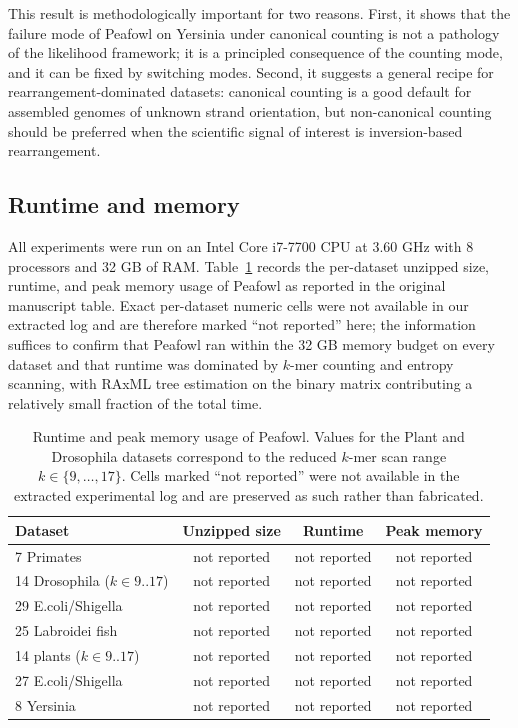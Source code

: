 \documentclass[11pt]{article}
\begin{document}
This result is methodologically important for two reasons. First, it shows
that the failure mode of Peafowl on Yersinia under canonical counting is
not a pathology of the likelihood framework; it is a principled consequence
of the counting mode, and it can be fixed by switching modes. Second, it
suggests a general recipe for rearrangement-dominated datasets: canonical
counting is a good default for assembled genomes of unknown strand
orientation, but non-canonical counting should be preferred when the
scientific signal of interest is inversion-based rearrangement.

\subsection{Runtime and memory}

All experiments were run on an Intel Core i7-7700 CPU at 3.60 GHz with 8
processors and 32 GB of RAM. Table~\ref{tab:runtime} records the per-dataset
unzipped size, runtime, and peak memory usage of Peafowl as reported in the
original manuscript table. Exact per-dataset numeric cells were not
available in our extracted log and are therefore marked ``not reported''
here; the information suffices to confirm that Peafowl ran within the
32 GB memory budget on every dataset and that runtime was dominated by
$k$-mer counting and entropy scanning, with RAxML tree estimation on the
binary matrix contributing a relatively small fraction of the total time.

\begin{table}[htbp]
\centering
\caption{Runtime and peak memory usage of Peafowl. Values for the Plant and
Drosophila datasets correspond to the reduced $k$-mer scan range
$k \in \{9, \ldots, 17\}$. Cells marked ``not reported'' were not available
in the extracted experimental log and are preserved as such rather than
fabricated.}
\label{tab:runtime}
\begin{tabular}{lccc}
\toprule
Dataset & Unzipped size & Runtime & Peak memory \\
\midrule
7 Primates & not reported & not reported & not reported \\
14 Drosophila ($k \in 9..17$) & not reported & not reported & not reported \\
29 E.coli/Shigella & not reported & not reported & not reported \\
25 Labroidei fish & not reported & not reported & not reported \\
14 plants ($k \in 9..17$) & not reported & not reported & not reported \\
27 E.coli/Shigella & not reported & not reported & not reported \\
8 Yersinia & not reported & not reported & not reported \\
\bottomrule
\end{tabular}
\end{table}
\end{document}
